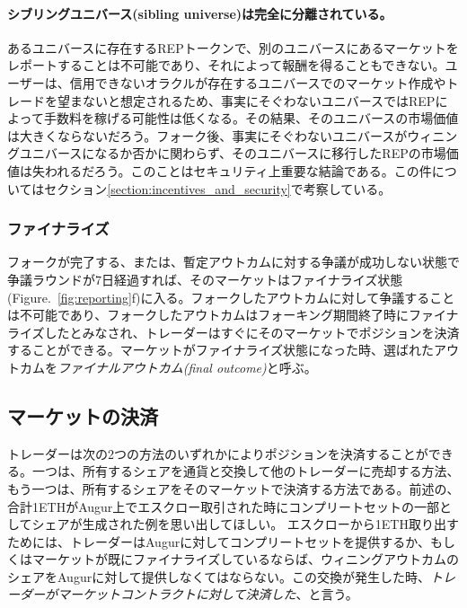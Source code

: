 \documentclass[floatfix,reprint,nofootinbib,amsmath,amssymb,epsfig,pre,floats,letterpaper,groupedaffiliation]{revtex4-1}
\theoremstyle{definition}
\theoremstyle{definition}
\theoremstyle{definition}
\begin{document}
\paragraph*{シブリングユニバース(sibling universe)は完全に分離されている。}あるユニバースに存在するREPトークンで、別のユニバースにあるマーケットをレポートすることは不可能であり、それによって報酬を得ることもできない。ユーザーは、信用できないオラクルが存在するユニバースでのマーケット作成やトレードを望まないと想定されるため、事実にそぐわないユニバースではREPによって手数料を稼げる可能性は低くなる。その結果、そのユニバースの市場価値は大きくならないだろう。フォーク後、事実にそぐわないユニバースがウィニングユニバースになるか否かに関わらず、そのユニバースに移行したREPの市場価値は失われるだろう。このことはセキュリティ上重要な結論である。この件についてはセクション\ref{section:incentives_and_security}で考察している。

\subsubsection{ファイナライズ}

フォークが完了する、または、暫定アウトカムに対する争議が成功しない状態で争議ラウンドが7日経過すれば、そのマーケットはファイナライズ状態(Figure.~\ref{fig:reporting}f)に入る。フォークしたアウトカムに対して争議することは不可能であり、フォークしたアウトカムはフォーキング期間終了時にファイナライズしたとみなされ、トレーダーはすぐにそのマーケットでポジションを決済することができる。マーケットがファイナライズ状態になった時、選ばれたアウトカムを\textit{ファイナルアウトカム(final outcome)}と呼ぶ。

\subsection{マーケットの決済}\label{section:settlement}

トレーダーは次の2つの方法のいずれかによりポジションを決済することができる。一つは、所有するシェアを通貨と交換して他のトレーダーに売却する方法、もう一つは、所有するシェアをそのマーケットで決済する方法である。前述の、合計1ETHがAugur上でエスクロー取引された時にコンプリートセットの一部としてシェアが生成された例を思い出してほしい。 エスクローから1ETH取り出すためには、トレーダーはAugurに対してコンプリートセットを提供するか、もしくはマーケットが既にファイナライズしているならば、ウィニングアウトカムのシェアをAugurに対して提供しなくてはならない。この交換が発生した時、\textit{トレーダーがマーケットコントラクトに対して決済した}、と言う。
\end{document}
